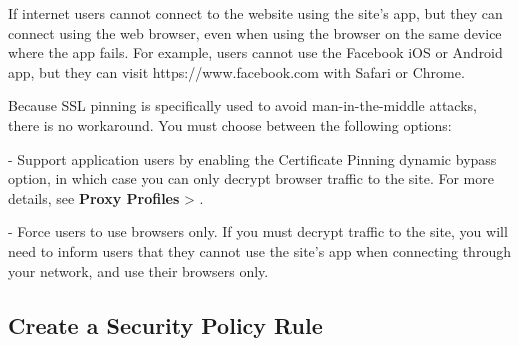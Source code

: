 If internet users cannot connect to the website using the site’s app, but they can connect using the web browser, 
even when using the browser on the same device where the app fails. For example, users cannot use the Facebook iOS or Android app, 
but they can visit https://www.facebook.com with Safari or Chrome.


Because SSL pinning is specifically used to avoid man-in-the-middle attacks, there is no workaround. You must choose between the following options:


- Support application users by enabling the Certificate Pinning dynamic bypass option, in which case you can only decrypt browser traffic to the site. 
For more details, see \textbf{Proxy Profiles} > \textbf{\hyperlink{link:Trusted Certificate Authorities}{\color{linkblue}{Decryption Profile}}}.


- Force users to use browsers only. If you must decrypt traffic to the site, you will need to inform users that they cannot use the site’s app 
when connecting through your network, and use their browsers only.

\subsection*{\hypertarget{link:Create a Security Policy Rule}{Create a Security Policy Rule}}
\label{sec:policies:security:create}

